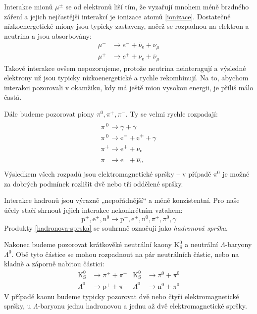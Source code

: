 \documentclass[10pt,a4paper]{article}
\newcommand*{\mask}[2]{\mathord{\makebox[\widthof{\(#1\)}]{\(#2\)}}}
\newcommand{\°}{\degree}
\renewcommand{\t}[1]{\mathrm{#1}}
\begin{document}
Interakce mionů $\mu^\pm$ se od elektronů liší tím, že vyzařují mnohem méně brzdného záření a jejich nejčastější interakcí je ionizace atomů \eqref{ionizace}. Dostatečně nízkoenergetické miony jsou typicky zastaveny, načež se rozpadnou na elektron a neutrina a jsou absorbovány:
\begin{equation}
    \begin{aligned}
        \mu^- &\to e^- + \overline{\nu}_{\t e} + \nu_\mu \\
        \mu^+ &\to e^+ + \nu_{\t e} + \overline{\nu}_\mu
    \end{aligned}
    \label{rozpad-mu}
\end{equation}
Takové interakce ovšem nepozorujeme, protože neutrina neinteragují a výsledné elektrony už jsou typicky nízkoenergetické a rychle rekombinují. Na to, abychom interakci pozorovali v okamžiku, kdy má ještě mion vysokou energii, je příliš málo častá.

Dále budeme pozorovat piony $\pi^0, \pi^+, \pi^-$. Ty se velmi rychle rozpadají:
\begin{equation}
    \begin{aligned}
        \pi{\mask{^+}{^0}} &\to \gamma + \gamma \\
        \pi{\mask{^+}{^0}} &\to \t e^- + \t e^+ + \gamma \\
        \pi^+ &\to \t e^+ + \nu_{\t e} \\
        \pi^- &\to \t e^- + \overline{\nu}_{\t e}
    \end{aligned}
    \label{rozpad-pi}
\end{equation}
Výsledkem všech rozpadů jsou elektromagnetické spršky – v případě $\pi^0$ je možné za dobrých podmínek rozlišit dvě nebo tři oddělené spršky.

Interakce hadronů jsou výrazně „nepořádnější“ a méně konzistentní. Pro naše účely stačí shrnout jejich interakce nekonkrétním vztahem:
\begin{equation}
    \t p^\pm, \t e^\pm, \t n^0 \to
    \t p^\pm, \t e^\pm, \t n^0, \pi^\pm, \pi^0, \gamma
    \label{hadronova-sprska}
\end{equation}
Produkty \eqref{hadronova-sprska} se souhrnně označují jako \textit{hadronová sprška}.

Nakonec budeme pozorovat krátkověké neutrální kaony $\t K^0_{\t S}$ a neutrální $\Lambda$-baryony $\Lambda^0$. Obě tyto částice se mohou rozpadnout na pár neutrálních částic, nebo na kladně a záporně nabitou částici:
\begin{equation}
    \begin{aligned}
        \t K^0_{\t S} &\to \pi^+ + \pi^- &
        \t K^0_{\t S} &\to \pi^0 + \pi^0 \\[3pt]
        \Lambda^0 &\to \t p^+ + \pi^- &
        \Lambda^0 &\to \t n^0 + \pi^0
    \end{aligned}
    \label{kaon-lambda}
\end{equation}
V případě kaonu budeme typicky pozorovat dvě nebo čtyři elektromagnetické spršky, u $\Lambda$-baryonu jednu hadronovou a jednu až dvě elektromagnetické spršky.
\end{document}
